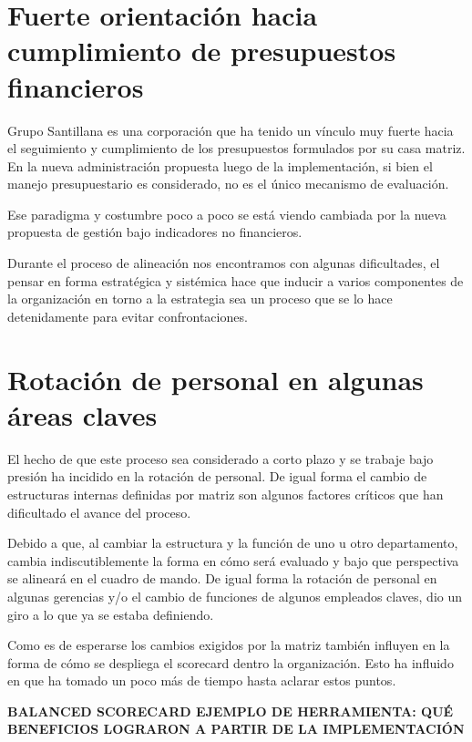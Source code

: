 \section{Fuerte orientación hacia cumplimiento de presupuestos financieros}
\item {Grupo Santillana es una corporación que ha tenido un vínculo muy fuerte hacia el seguimiento y cumplimiento de los presupuestos formulados por su casa matriz. En la nueva administración propuesta luego de la implementación, si bien el manejo presupuestario es considerado, no es el único mecanismo de evaluación.

Ese paradigma y costumbre poco a poco se está viendo cambiada por la nueva propuesta de gestión bajo indicadores no financieros.

Durante el proceso de alineación nos encontramos con algunas dificultades, el pensar en forma estratégica y sistémica hace que inducir a varios componentes de la organización en torno a la estrategia sea un proceso que se lo hace detenidamente para evitar confrontaciones.}

\section{Rotación de personal en algunas áreas claves}
\item {El hecho de que este proceso sea considerado a corto plazo y se trabaje bajo presión ha incidido en la rotación de personal. De igual forma el cambio de estructuras internas definidas por matriz son algunos factores críticos que han dificultado el avance del proceso.

Debido a que, al cambiar la estructura y la función de uno u otro departamento, cambia indiscutiblemente la forma en cómo será evaluado y bajo que perspectiva se alineará en el cuadro de mando. De igual forma la rotación de personal en algunas gerencias y/o el cambio de funciones de algunos empleados claves, dio un giro a lo que ya se estaba definiendo.

Como es de esperarse los cambios exigidos por la matriz también influyen en la forma de cómo se despliega el scorecard dentro la organización. Esto ha influido en que ha tomado un poco más de tiempo hasta aclarar estos puntos.}




\begin{center}
\vspace*{0.1in}
\begin{Large}
\textbf{BALANCED SCORECARD EJEMPLO DE HERRAMIENTA: QUÉ BENEFICIOS LOGRARON A PARTIR DE LA IMPLEMENTACIÓN} \\
\end{Large}
\end{center}

